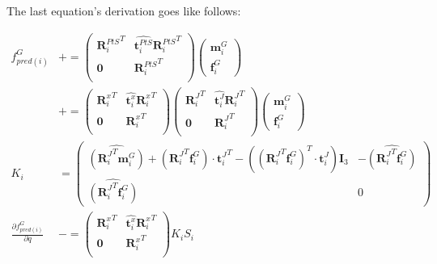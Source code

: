 The last equation's derivation goes like follows:

\begin{align}
  f^G_{pred(i)} & +=
  \begin{pmatrix}
    {\mathbf{R}^{PtS}_i}^T & \widehat{\mathbf{t}^{PtS}_i}{\mathbf{R}^{PtS}_i}^T \\
    \mathbf{0} & {\mathbf{R}^{PtS}_i}^T \\
  \end{pmatrix}
  \begin{pmatrix}
    \mathbf{m}^{G}_i \\ \mathbf{f}^{G}_i
  \end{pmatrix}
  \\
  & += \begin{pmatrix}
    {\mathbf{R}^{x}_i}^T & \widehat{\mathbf{t}^{x}_i}{\mathbf{R}^{x}_i}^T \\
    \mathbf{0} & {\mathbf{R}^{x}_i}^T \\
  \end{pmatrix}
  \begin{pmatrix}
    {\mathbf{R}^{J}_i}^T & \widehat{\mathbf{t}^{J}_i}{\mathbf{R}^{J}_i}^T \\
    \mathbf{0} & {\mathbf{R}^{J}_i}^T \\
  \end{pmatrix}
  \begin{pmatrix}
    \mathbf{m}^{G}_i \\ \mathbf{f}^{G}_i
  \end{pmatrix}
  \\
  K_i &=
  \begin{pmatrix}
    \widehat{({\mathbf{R}_i^J}^T \mathbf{m}^{G}_i)}
    + \left({\mathbf{R}_i^J}^T \mathbf{f}^{G}_i\right) \cdot {\mathbf{t}^J_i}^T
    - \left( {({\mathbf{R}_i^J}^T \mathbf{f}^{G}_i)}^T \cdot \mathbf{t}^J_i\right) \mathbf{I}_3
    & -\widehat{({\mathbf{R}_i^J}^T \mathbf{f}^{G}_i)} \\
    \widehat{({\mathbf{R}_i^J}^T \mathbf{f}^{G}_i)} & 0
  \end{pmatrix}
  \\
  \frac{\partial f^G_{pred(i)}}{\partial q} & -=
  \begin{pmatrix}
    {\mathbf{R}^{x}_i}^T & \widehat{\mathbf{t}^{x}_i}{\mathbf{R}^{x}_i}^T \\
    \mathbf{0} & {\mathbf{R}^{x}_i}^T \\
  \end{pmatrix}
  K_i S_i
\end{align}


